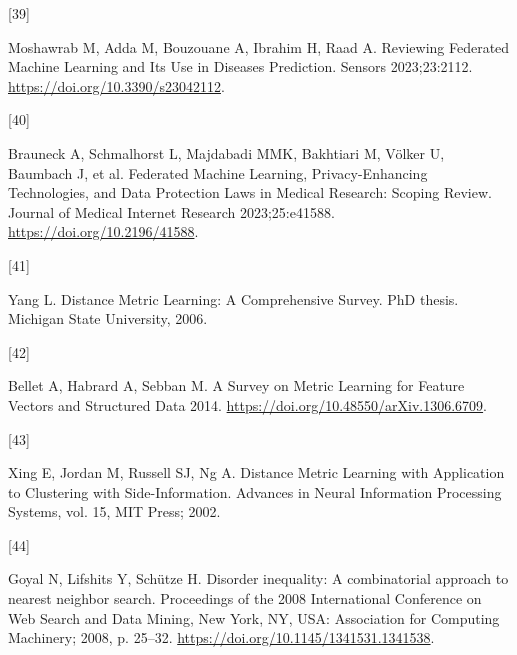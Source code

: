 \documentclass[preprint, 3p,
authoryear]{elsarticle} %
\newlength{\cslhangindent}
\newlength{\csllabelwidth}
\newlength{\cslentryspacingunit} %
\newenvironment{CSLReferences}[2] %
 {%
  \setlength{\parindent}{0pt}
  \ifodd #1
  \let\oldpar\par
  \def\par{\hangindent=\cslhangindent\oldpar}
  \fi
  \setlength{\parskip}{#2\cslentryspacingunit}
 }%
 {}
\newcommand{\CSLLeftMargin}[1]{\parbox[t]{\csllabelwidth}{#1}}
\newcommand{\CSLRightInline}[1]{\parbox[t]{\linewidth - \csllabelwidth}{#1}\break}
\begin{document}
\begin{CSLReferences}{0}{0}
\leavevmode{}%
\CSLLeftMargin{{[}39{]} }%
\CSLRightInline{Moshawrab M, Adda M, Bouzouane A, Ibrahim H, Raad A.
Reviewing {Federated Machine Learning} and {Its Use} in {Diseases
Prediction}. Sensors 2023;23:2112.
\url{https://doi.org/10.3390/s23042112}.}

\leavevmode{}%
\CSLLeftMargin{{[}40{]} }%
\CSLRightInline{Brauneck A, Schmalhorst L, Majdabadi MMK, Bakhtiari M,
Völker U, Baumbach J, et al. Federated {Machine Learning},
{Privacy-Enhancing Technologies}, and {Data Protection Laws} in {Medical
Research}: {Scoping Review}. Journal of Medical Internet Research
2023;25:e41588. \url{https://doi.org/10.2196/41588}.}

\leavevmode{}%
\CSLLeftMargin{{[}41{]} }%
\CSLRightInline{Yang L. Distance {Metric Learning}: {A Comprehensive
Survey}. PhD thesis. Michigan State University, 2006.}

\leavevmode{}%
\CSLLeftMargin{{[}42{]} }%
\CSLRightInline{Bellet A, Habrard A, Sebban M. A {Survey} on {Metric
Learning} for {Feature Vectors} and {Structured Data} 2014.
\url{https://doi.org/10.48550/arXiv.1306.6709}.}

\leavevmode{}%
\CSLLeftMargin{{[}43{]} }%
\CSLRightInline{Xing E, Jordan M, Russell SJ, Ng A. Distance {Metric
Learning} with {Application} to {Clustering} with {Side-Information}.
Advances in {Neural Information Processing Systems}, vol. 15, {MIT
Press}; 2002.}

\leavevmode{}%
\CSLLeftMargin{{[}44{]} }%
\CSLRightInline{Goyal N, Lifshits Y, Schütze H. Disorder inequality: A
combinatorial approach to nearest neighbor search. Proceedings of the
2008 {International Conference} on {Web Search} and {Data Mining}, {New
York, NY, USA}: {Association for Computing Machinery}; 2008, p. 25--32.
\url{https://doi.org/10.1145/1341531.1341538}.}

\end{CSLReferences}
\end{document}
